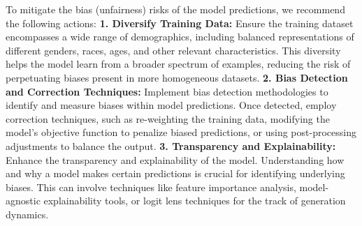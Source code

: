To mitigate the bias (unfairness) risks of the model predictions, we recommend the following actions: 
\textbf{1. Diversify Training Data:} Ensure the training dataset encompasses a wide range of demographics, including balanced representations of different genders, races, ages, and other relevant characteristics. This diversity helps the model learn from a broader spectrum of examples, reducing the risk of perpetuating biases present in more homogeneous datasets.
\textbf{2. Bias Detection and Correction Techniques:} Implement bias detection methodologies to identify and measure biases within model predictions. Once detected, employ correction techniques, such as re-weighting the training data, modifying the model's objective function to penalize biased predictions, or using post-processing adjustments to balance the output.
\textbf{3. Transparency and Explainability:} Enhance the transparency and explainability of the model. Understanding how and why a model makes certain predictions is crucial for identifying underlying biases. This can involve techniques like feature importance analysis, model-agnostic explainability tools, or logit lens techniques for the track of generation dynamics.